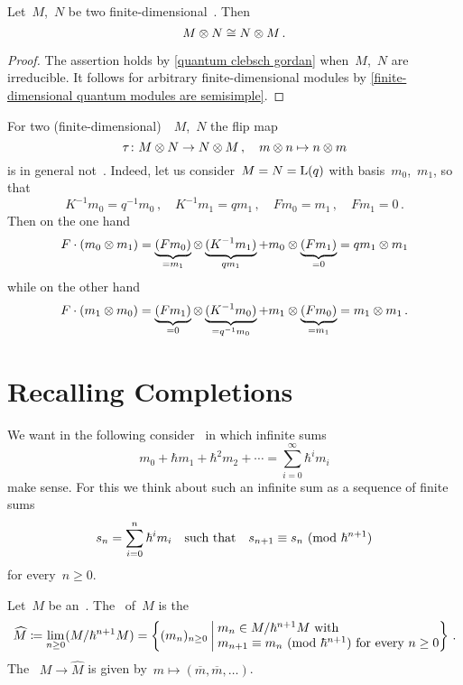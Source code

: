 \documentclass[a4paper, 11pt, oneside]{scrartcl}
\begin{document}
\begin{corollary}
  Let~$M$,~$N$ be two finite-dimensional~.
  Then
  \[
    M \otimes N
    \cong
    N \otimes M \,.
  \]
\end{corollary}

\begin{proof}
  The assertion holds by \cref{quantum clebsch gordan} when~$M$,~$N$ are irreducible.
  It follows for arbitrary finite-dimensional modules by \cref{finite-dimensional quantum modules are semisimple}.
\end{proof}

\begin{warning}
  For two (finite-dimensional)~~$M$,~$N$ the flip map
  \[
    \tau
    \colon
    M \otimes N
    \to
    N \otimes M \,,
    \quad
    m \otimes n
    \mapsto
    n \otimes m
  \]
  is in general not~.
  Indeed, let us consider~$M = N = \operatorname{L}(q)$ with basis~$m_0$,~$m_1$, so that
  \[
    K^{-1} m_0 = q^{-1} m_0 \,,
    \quad
    K^{-1} m_1 = q m_1 \,,
    \quad
    F m_0 = m_1 \,,
    \quad
    F m_1 = 0 \,.
  \]
  Then on the one hand
  \[
    F \cdot (m_0 \otimes m_1)
    =
    \underbrace{ (F m_0) }_{= m_1}
    \otimes
    \underbrace{ (K^{-1} m_1) }_{q m_1}
    +
    m_0 \otimes \underbrace{ (F m_1) }_{= 0}
    =
    q m_1 \otimes m_1
  \]
  while on the other hand
  \[
    F \cdot (m_1 \otimes m_0)
    =
    \underbrace{ (F m_1) }_{= 0}
    \otimes
    \underbrace{ (K^{-1} m_0) }_{= q^{-1} m_0}
    +
    m_1 \otimes \underbrace{ (F m_0) }_{= m_1}
    =
    m_1 \otimes m_1 \,.
  \]
\end{warning}






\section{Recalling Completions}

We want in the following consider~\modules{$\kfhbar$} in which infinite sums
\[
  m_0 + \hbar m_1 + \hbar^2 m_2 + \dotsb
  =
  \sum_{i=0}^\infty \hbar^i m_i
\]
make sense.
For this we think about such an infinite sum as a sequence of finite sums
\[
  s_n = \sum_{i=0}^n \hbar^i m_i
  \quad
  \text{such that}
  \quad
  s_{n+1} \equiv s_n \ (\mathrm{mod}\ \hbar^{n+1})
\]
for every~$n \geq 0$.

\begin{definition}
  Let~$M$ be an~\module{$\kfhbar$}.
  The~ of~$M$ is the~\module{$\kfhbar$}
  \[
    \widehat{M}
    \defined
    \lim_{n \geq 0} (M / \hbar^{n+1} M)
    =
    \left\{
      (m_n)_{n \geq 0}
    \suchthat*
      \begin{tabular}{@{}l@{}}
        $m_n \in M/ \hbar^{n+1} M$ with \\
        $m_{n+1} \equiv m_n \pMod{\hbar^{n+1}}$ for every~$n \geq 0$
      \end{tabular}
    \right\} \,.
  \]
  The ~$M \to \widehat{M}$ is given by~$m \mapsto (\overline{m}, \overline{m}, \dotsc)$.
\end{definition}
\end{document}
